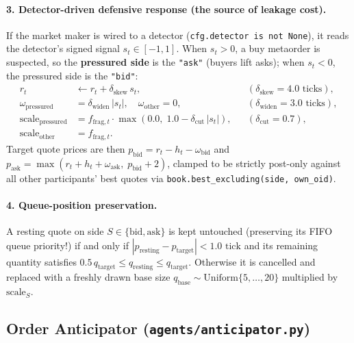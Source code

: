 \documentclass[11pt,a4paper]{article}
\newcommand{\code}[1]{\texttt{#1}}
\begin{document}
\paragraph{3. Detector-driven defensive response (the source of leakage cost).} If the market maker is
wired to a detector (\code{cfg.detector is not None}), it reads the detector's signed signal
$s_t \in [-1, 1]$. When $s_t > 0$, a buy metaorder is suspected, so the \textbf{pressured side} is the
\code{"ask"} (buyers lift asks); when $s_t < 0$, the pressured side is the \code{"bid"}:
\begin{align}
  r_t &\leftarrow r_t + \delta_{\text{skew}}\,s_t, && (\delta_{\text{skew}} = 4.0\text{ ticks}), \\
  \omega_{\text{pressured}} &= \delta_{\text{widen}}\,|s_t|,\quad \omega_{\text{other}} = 0, && (\delta_{\text{widen}} = 3.0\text{ ticks}), \\
  \text{scale}_{\text{pressured}} &= f_{\text{frag},t}\cdot\max(0.0,\; 1.0 - \delta_{\text{cut}}\,|s_t|), && (\delta_{\text{cut}} = 0.7), \\
  \text{scale}_{\text{other}} &= f_{\text{frag},t}.
\end{align}
Target quote prices are then $p_{\text{bid}} = r_t - h_t - \omega_{\text{bid}}$ and
$p_{\text{ask}} = \max(r_t + h_t + \omega_{\text{ask}},\; p_{\text{bid}} + 2)$, clamped to be strictly
post-only against all other participants' best quotes via \code{book.best\_excluding(side, own\_oid)}.

\paragraph{4. Queue-position preservation.} A resting quote on side $S \in \{\text{bid}, \text{ask}\}$ is
kept untouched (preserving its FIFO queue priority!) if and only if
$|p_{\text{resting}} - p_{\text{target}}| < 1.0\text{ tick}$ and its remaining quantity satisfies
$0.5\,q_{\text{target}} \le q_{\text{resting}} \le q_{\text{target}}$. Otherwise it is cancelled and
replaced with a freshly drawn base size $q_{\text{base}} \sim \text{Uniform}\{5,\dots,20\}$ multiplied by
$\text{scale}_S$.

\subsection{Order Anticipator (\code{agents/anticipator.py})}
\label{sec:anticipator}
\end{document}
